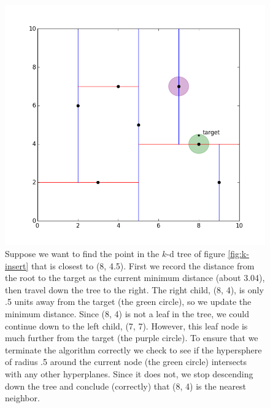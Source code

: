 \begin{figure}[H]
\includegraphics[width=\textwidth]{kdpic3.png}
\caption{Suppose we want to find the point in the $k$-d tree of figure \ref{fig:k-insert} that is closest to (8, 4.5). First we record the distance from the root to the target as the current minimum distance (about 3.04), then travel down the tree to the right. The right child, (8, 4), is only .5 units away from the target (the green circle), so we update the minimum distance. Since (8, 4) is not a leaf in the tree, we could continue down to the left child, (7, 7). However, this leaf node is much further from the target (the purple circle). To ensure that we terminate the algorithm correctly we check to see if the hypersphere of radius .5 around the current node (the green circle) intersects with any other hyperplanes. Since it does not, we stop descending down the tree and conclude (correctly) that (8, 4) is the nearest neighbor.}
\label{fig:bad-search}
\end{figure}

